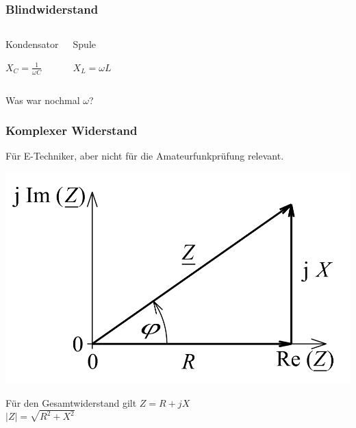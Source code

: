 \begin{frame}
  \frametitle{Blindwiderstand}
  \begin{columns}
    \begin{block}{Kondensator}
      \begin{center}
	\huge{$X_{C} = \frac{1}{\omega C}$}
      \end{center}
    \end{block}
    
    \begin{block}{Spule}
      \begin{center}
	\huge{$X_{L} = \omega L$}
      \end{center}
    \end{block}
  \end{columns}

  \begin{center}
    \vspace{1cm}
    Was war nochmal $\omega$? \\
  \end{center}
\end{frame}

\begin{frame}
\frametitle{Komplexer Widerstand}
Für E-Techniker, aber nicht für die Amateurfunkprüfung relevant.
\begin{center}
		\includegraphics[width=.8\textwidth,height=.5\textheight,keepaspectratio]{a03/Widerstand_Zeiger.png}
		{\tiny \hyperlink{refs}{\cite{wc}}}
\begin{block}{Für den Gesamtwiderstand gilt}
$Z = R + jX$ \\
$|Z| = \sqrt{R^2 + X^2}$
\end{block}
\end{center}
\end{frame}
	
